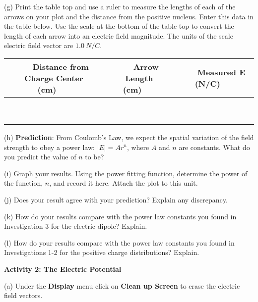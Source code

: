 (g) Print the table top and use a ruler to measure the lengths of each of the arrows
on your plot and the distance from the positive nucleus. 
Enter this data in the table below.
Use the scale at the bottom of the table top to convert the length of each arrow into 
an electric field magnitude.
The units of the scale electric field vector are $1.0 ~ N/C$.

\vspace{0.3cm}
{\centering \begin{tabular}{|c|c|c|}
\hline 
~~~Distance from Charge Center (cm)~~~&
~~~Arrow Length (cm)~~~&
~~~Measured E (N/C)~~~\\
\hline
\hline 
&
&
\\
\hline 
&
&
\\
\hline 
&
&
\\
\hline 
&
&
\\
\hline 
&
&
\\
\hline 
&
&
\\
\hline 
&
&
\\
\hline 
&
&
\\
\hline 
&
&
\\
\hline
\end{tabular}\par}
\vspace{0.3cm}


(h) \textbf{Prediction}: From Coulomb's Law, we expect the spatial variation
of the field strength to obey a power law: \( \left| E\right| =Ar^{n} \),
where \( A \) and \( n \) are constants. What do you predict the
value of \( n \) to be?
\answerspace{15mm}

(i) Graph your results. Using the power fitting
function, determine the power of the function, $n$, and record it here.
Attach the plot to this unit.
\answerspace{15mm}

(j) Does your result agree with your prediction? Explain any discrepancy.
\answerspace{15mm}

(k) How do your results compare with the power law constants you found
in Investigation 3 for the electric dipole? Explain.
\answerspace{15mm}

(l) How do your results compare with the power law constants you found
in Investigations 1-2 for the positive charge distributions? Explain.
\answerspace{15mm}


\textbf{Activity 2: The Electric Potential}

(a) Under the {\bf Display} menu click on {\bf Clean up Screen} to erase the
electric field vectors.

